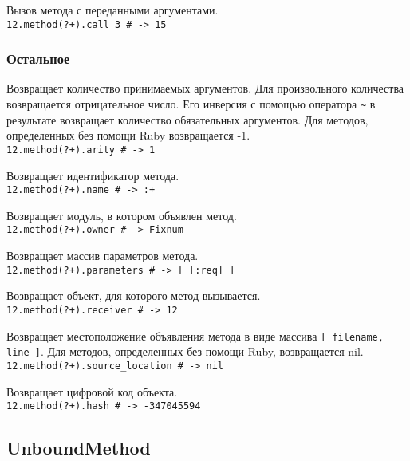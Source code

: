 \begin{methodlist}
  Вызов метода с переданными аргументами.
  \\\verb!12.method(?+).call 3 # -> 15!
\end{methodlist}

\subsubsection*{Остальное}

\begin{methodlist}
  Возвращает количество принимаемых аргументов. Для произвольного количества возвращается отрицательное число. Его инверсия с помощью оператора \verb!~! в результате возвращает количество обязательных аргументов. Для методов, определенных без помощи Ruby возвращается -1.
  \\\verb!12.method(?+).arity # -> 1!

  Возвращает идентификатор метода.
  \\\verb!12.method(?+).name # -> :+!

  Возвращает модуль, в котором объявлен метод.
  \\\verb!12.method(?+).owner # -> Fixnum!

  Возвращает массив параметров метода.
  \\\verb!12.method(?+).parameters # -> [ [:req] ]!

  Возвращает объект, для которого метод вызывается.
  \\\verb!12.method(?+).receiver # -> 12!

  Возвращает местоположение объявления метода в виде массива \verb![ filename, line ]!. Для методов, определенных без помощи Ruby, возвращается nil.  
  \\\verb!12.method(?+).source_location # -> nil!

  Возвращает цифровой код объекта.
  \\\verb!12.method(?+).hash # -> -347045594!
\end{methodlist}

\subsection{UnboundMethod}


